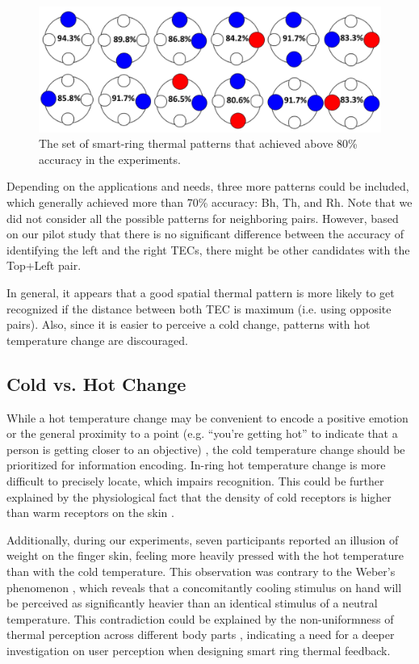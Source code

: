 \documentclass[preprint,12pt]{elsarticle}
\begin{document}
\begin{figure}[tp]
  \centering
  \includegraphics[width=0.9\columnwidth]{img/fig14.png}
  \caption{The set of smart-ring thermal patterns that achieved above 80\% accuracy in the experiments.}
  \label{fig:14}
\end{figure}

Depending on the applications and needs, three more patterns could be included, which generally achieved more than 70\% accuracy: Bh, Th, and Rh. Note that we did not consider all the possible patterns for neighboring pairs. However, based on our pilot study that there is no significant difference between the accuracy of identifying the left and the right TECs, there might be other candidates with the Top+Left pair.

In general, it appears that a good spatial thermal pattern is more likely to get recognized if the distance between both TEC is maximum (i.e. using opposite pairs). Also, since it is easier to perceive a cold change, patterns with hot temperature change are discouraged.

\subsection{Cold vs. Hot Change}
While a hot temperature change may be convenient to encode a positive emotion \cite{41} or the general proximity to a point (e.g. ``you're getting hot'' to indicate that a person is getting closer to an objective) \cite{34}, the cold temperature change should be prioritized for information encoding. In-ring hot temperature change is more difficult to precisely locate, which impairs recognition. This could be further explained by the physiological fact that the density of  cold receptors is higher than warm receptors on the skin \cite{15}.

Additionally, during our experiments, seven participants reported an illusion of weight on the finger skin, feeling more heavily pressed with the hot temperature than with the cold temperature. This observation was contrary to the Weber's phenomenon \cite{4}, which reveals that a concomitantly cooling stimulus on hand will be perceived as significantly heavier than an identical stimulus of a neutral temperature. This contradiction could be explained by the non-uniformness of thermal perception across different body parts \cite{31}, indicating a need for a deeper investigation on user perception when designing smart ring thermal feedback.
\end{document}
